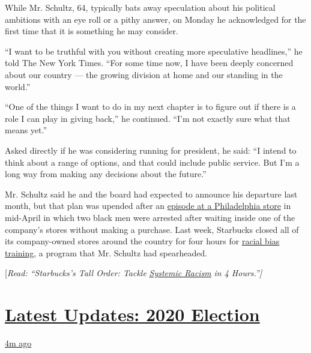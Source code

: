 While Mr. Schultz, 64, typically bats away speculation about his
political ambitions with an eye roll or a pithy answer, on Monday he
acknowledged for the first time that it is something he may consider.

``I want to be truthful with you without creating more speculative
headlines,'' he told The New York Times. ``For some time now, I have
been deeply concerned about our country --- the growing division at home
and our standing in the world.''

``One of the things I want to do in my next chapter is to figure out if
there is a role I can play in giving back,'' he continued. ``I'm not
exactly sure what that means yet.''

Asked directly if he was considering running for president, he said: ``I
intend to think about a range of options, and that could include public
service. But I'm a long way from making any decisions about the
future.''

Mr. Schultz said he and the board had expected to announce his departure
last month, but that plan was upended after an
\href{https://www.nytimes3xbfgragh.onion/2018/04/15/us/starbucks-philadelphia-black-men-arrest.html}{episode
at a Philadelphia store} in mid-April in which two black men were
arrested after waiting inside one of the company's stores without making
a purchase. Last week, Starbucks closed all of its company-owned stores
around the country for four hours for
\href{https://www.nytimes3xbfgragh.onion/2018/05/29/business/starbucks-closing-racial-bias-training.html}{racial
bias training}, a program that Mr. Schultz had spearheaded.

{[}\emph{Read: ``Starbucks's Tall Order: Tackle}
\href{https://www.nytimes3xbfgragh.onion/2018/05/29/business/starbucks-closing-racial-bias-training.html}{\emph{Systemic
Racism}} \emph{in 4 Hours.''{]}}

\hypertarget{latest-updates-2020-election}{%
\section{\texorpdfstring{\href{https://www.nytimes3xbfgragh.onion/live/2020/08/17/us/dnc-convention?action=click\&pgtype=Article\&state=default\&region=MAIN_CONTENT_1\&context=storylines_live_updates}{Latest
Updates: 2020
Election}}{Latest Updates: 2020 Election}}\label{latest-updates-2020-election}}

\href{https://www.nytimes3xbfgragh.onion/live/2020/08/17/us/dnc-convention?action=click\&pgtype=Article\&state=default\&region=MAIN_CONTENT_1\&context=storylines_live_updates\#michelle-obama-hits-trump-for-lacking-empathy-in-searing-keynote-speech}{4m
ago}

